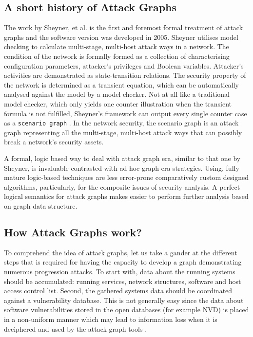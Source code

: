 \subsection{A short history of Attack Graphs}
The work by Sheyner, et al. \cite{sheyner2002automated} is the first and foremost formal treatment of attack graphs and the software version was developed in 2005. Sheyner utilises model checking to calculate multi-stage, multi-host attack ways in a network. The condition of the network is formally formed as a collection of characterising configuration parameters, attacker's privileges and Boolean variables. Attacker's activities are demonstrated as state-transition relations. The security property of the network is determined as a transient equation, which can be automatically analysed against the model by a model checker. Not at all like a traditional model checker, which only yields one counter illustration when the transient formula is not fulfilled, Sheyner's framework can output every single counter case as a \texttt{scenario graph} \cite{ou2006scalable}. In the network security, the scenario graph is an attack graph representing all the multi-stage, multi-host attack ways that can possibly break a network's security assets. 

A formal, logic based way to deal with attack graph era, similar to that one by Sheyner, is invaluable contrasted with ad-hoc graph era strategies. Using, fully mature logic-based techniques are less error-prone comparatively custom designed algorithms, particularly, for the composite issues of security analysis. A perfect logical semantics for attack graphs makes easier to perform further analysis based on graph data structure.

\subsection{How Attack Graphs work?}
To comprehend the idea of attack graphs, let us take a gander at the different steps that is required for having the capacity to develop a graph demonstrating numerous progression attacks. To start with, data about the running systems should be accumulated: running services, network structures, software and host access control list. Second, the gathered systems data should be coordinated against a vulnerability database. This is not generally easy since the data about software vulnerabilities stored in the open databases (for example NVD) is placed in a non-uniform manner which may lead to information loss when it is deciphered and used by the attack graph tools \cite{sommestad2015empirical}.

